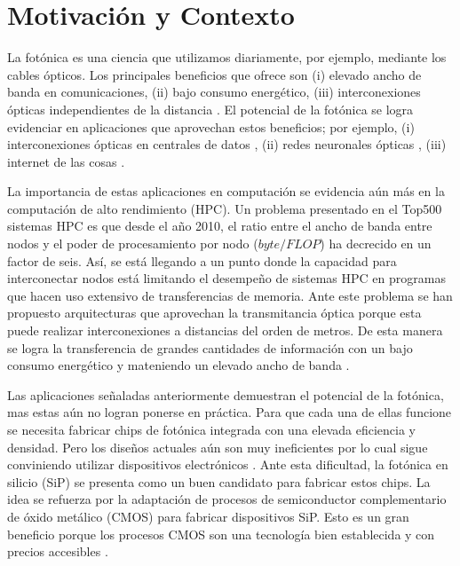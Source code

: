 \chapter{Motivación y Contexto}

La fotónica es una ciencia que utilizamos diariamente, por ejemplo, mediante los cables ópticos.
Los principales beneficios que ofrece son (i) elevado ancho de banda en comunicaciones, (ii) bajo consumo energético, (iii) interconexiones ópticas independientes de la distancia \citep{Glick2018}.
El potencial de la fotónica se logra evidenciar en aplicaciones que aprovechan estos beneficios; por ejemplo,
(i) interconexiones ópticas en centrales de datos \citep{Shen2019}, 
(ii) redes neuronales ópticas \citep{Shen2017}, 
(iii) internet de las cosas \citep{Glick2018}.


La importancia de estas aplicaciones en computación se evidencia aún más en la computación de alto rendimiento (HPC).
Un problema presentado en el Top500 sistemas HPC es que desde el año 2010, el ratio entre el ancho de banda entre nodos y el poder de procesamiento por nodo ($byte / FLOP$) ha decrecido en un factor de seis.
Así, se está llegando a un punto donde la capacidad para interconectar nodos está limitando el desempeño de sistemas HPC en programas que hacen uso extensivo de transferencias de memoria.
Ante este problema se han propuesto arquitecturas que aprovechan la transmitancia óptica porque esta puede realizar interconexiones a distancias del orden de metros. 
De esta manera se logra la transferencia de grandes cantidades de información con un bajo consumo energético y mateniendo un elevado ancho de banda \citep{Shen2019, Anderson2018}.


Las aplicaciones señaladas anteriormente demuestran el potencial de la fotónica, mas estas aún no logran ponerse en práctica. 
Para que cada una de ellas funcione se necesita fabricar chips de fotónica integrada con una elevada eficiencia y densidad.
Pero los diseños actuales aún son muy ineficientes por lo cual sigue conviniendo utilizar dispositivos electrónicos \citep{Glick2018, Vuckovic2019}. 
Ante esta dificultad, la fotónica en silicio (SiP) se presenta como un buen candidato para fabricar estos chips.
La idea se refuerza por la adaptación de procesos de semiconductor complementario de óxido metálico (CMOS) para fabricar dispositivos SiP.
Esto es un gran beneficio porque los procesos CMOS son una tecnología bien establecida y con precios accesibles \citep{Glick2018, Shen2019, LukasChrostowski2010}.


